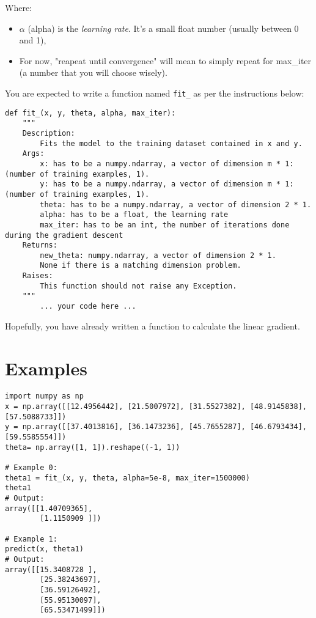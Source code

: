 Where:
\begin{itemize}
  \item $\alpha$ (alpha) is the \textit{learning rate}. It's a small float number (usually between 0 and 1),
  \item For now, "reapeat until convergence" will mean to simply repeat for max\_iter (a number that you will choose wisely).
\end{itemize}
You are expected to write a function named \texttt{fit\_} as per the instructions below:\\
\newline
\begin{verbatim}
def fit_(x, y, theta, alpha, max_iter):
	"""
	Description:
		Fits the model to the training dataset contained in x and y.
	Args:
		x: has to be a numpy.ndarray, a vector of dimension m * 1: (number of training examples, 1).
		y: has to be a numpy.ndarray, a vector of dimension m * 1: (number of training examples, 1).
		theta: has to be a numpy.ndarray, a vector of dimension 2 * 1.
		alpha: has to be a float, the learning rate
		max_iter: has to be an int, the number of iterations done during the gradient descent
	Returns:
		new_theta: numpy.ndarray, a vector of dimension 2 * 1.
		None if there is a matching dimension problem.
	Raises:
		This function should not raise any Exception.
	"""
		... your code here ...
\end{verbatim}
Hopefully, you have already written a function to calculate the linear gradient.\\

\section*{Examples}
\begin{verbatim}
import numpy as np
x = np.array([[12.4956442], [21.5007972], [31.5527382], [48.9145838], [57.5088733]])
y = np.array([[37.4013816], [36.1473236], [45.7655287], [46.6793434], [59.5585554]])
theta= np.array([1, 1]).reshape((-1, 1))

# Example 0:
theta1 = fit_(x, y, theta, alpha=5e-8, max_iter=1500000)
theta1
# Output:
array([[1.40709365],
		[1.1150909 ]])

# Example 1:
predict(x, theta1)
# Output:
array([[15.3408728 ],
		[25.38243697],
		[36.59126492],
		[55.95130097],
		[65.53471499]])
\end{verbatim}


